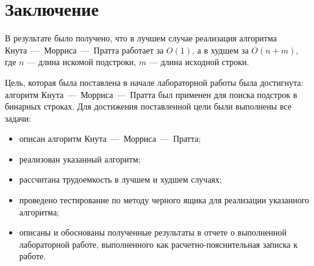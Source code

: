 \chapter*{Заключение}

В результате было получено, что в лучшем случае реализация алгоритма Кнута~---~Морриса~---~Пратта работает за $O(1)$, а в худшем за $O(n + m)$, где $n$ --- длина искомой подстроки, $m$ --- длина исходной строки.

Цель, которая была поставлена в начале лабораторной работы была достигнута: алгоритм Кнута~---~Морриса~---~Пратта был применен для поиска подстрок в бинарных строках. Для достижения поставленной цели были выполнены все задачи:
\begin{itemize}[label=---]
	\item описан алгоритм Кнута~---~Морриса~---~Пратта;
	\item реализован указанный алгоритм;
	\item рассчитана трудоемкость в лучшем и худшем случаях;
	\item проведено тестирование по методу черного ящика для реализации указанного алгоритма;
	\item описаны и обоснованы полученные результаты в отчете о выполненной лабораторной работе, выполненного как расчетно-пояснительная записка к работе.
\end{itemize}